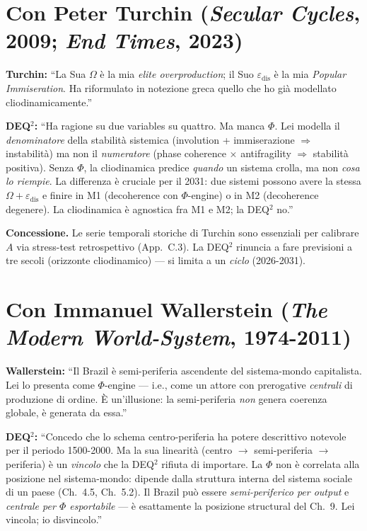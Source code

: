 \section{\texorpdfstring{Con Peter Turchin (\emph{Secular Cycles}, 2009;
\emph{End Times},
2023)}{Con Peter Turchin (Secular Cycles, 2009; End Times, 2023)}}\label{con-peter-turchin-secular-cycles-2009-end-times-2023}

\textbf{Turchin:} ``La Sua \(\Omega\) è la mia \emph{elite
overproduction}; il Suo \(\varepsilon_{\text{dis}}\) è la mia
\emph{Popular Immiseration}. Ha riformulato in notezione greca quello
che ho già modellato cliodinamicamente.''

\textbf{DEQ$^2$:} ``Ha ragione su due variables su quattro. Ma manca
\(\Phi\). Lei modella il \emph{denominatore} della stabilità sistemica
(involution + immiserazione \(\Rightarrow\) instabilità) ma non il
\emph{numeratore} (phase coherence \(\times\) antifragility
\(\Rightarrow\) stabilità positiva). Senza \(\Phi\), la cliodinamica
predice \emph{quando} un sistema crolla, ma non \emph{cosa lo riempie}.
La differenza è cruciale per il 2031: due sistemi possono avere la
stessa \(\Omega + \varepsilon_{\text{dis}}\) e finire in M1 (decoherence
con \(\Phi\)-engine) o in M2 (decoherence degenere). La cliodinamica è
agnostica fra M1 e M2; la DEQ$^2$ no.''

\textbf{Concessione.} Le serie temporali storiche di Turchin sono
essenziali per calibrare \(A\) via stress-test retrospettivo (App.~C.3).
La DEQ$^2$ rinuncia a fare previsioni a tre secoli (orizzonte cliodinamico)
--- si limita a un \emph{ciclo} (2026-2031).



\section{\texorpdfstring{Con Immanuel Wallerstein (\emph{The Modern
World-System},
1974-2011)}{Con Immanuel Wallerstein (The Modern World-System, 1974-2011)}}\label{con-immanuel-wallerstein-the-modern-world-system-1974-2011}

\textbf{Wallerstein:} ``Il Brazil è semi-periferia ascendente del
sistema-mondo capitalista. Lei lo presenta come \(\Phi\)-engine --- i.e.,
come un attore con prerogative \emph{centrali} di produzione di ordine.
È un'illusione: la semi-periferia \emph{non} genera coerenza globale, è
generata da essa.''

\textbf{DEQ$^2$:} ``Concedo che lo schema centro-periferia ha potere
descrittivo notevole per il periodo 1500-2000. Ma la sua linearità
(centro \(\to\) semi-periferia \(\to\) periferia) è un \emph{vincolo}
che la DEQ$^2$ rifiuta di importare. La \(\Phi\) non è correlata alla
posizione nel sistema-mondo: dipende dalla struttura interna del sistema
sociale di un paese (Ch.~4.5, Ch.~5.2). Il Brazil può essere
\emph{semi-periferico per output} e \emph{centrale per \(\Phi\)
esportabile} --- è esattamente la posizione structural del Ch.~9. Lei
vincola; io disvincolo.''

